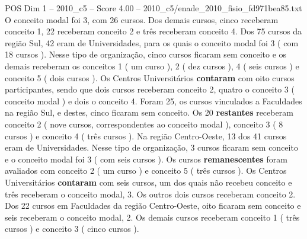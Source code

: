\begin{textsample}{POS Dim 1 – 2010\_c5 – Score 4.00 – 2010\_c5/enade\_2010\_fisio\_fd971bea85.txt}
O conceito modal foi 3, com 26 cursos.
Dos demais cursos, cinco receberam conceito 1, 22 receberam conceito 2 e três receberam conceito 4.
Dos 75 cursos da região Sul, 42 eram de Universidades, para os quais o conceito modal foi 3 ( com 18 cursos ).
Nesse tipo de organização, cinco cursos ficaram sem conceito e os demais receberam os conceitos 1 ( um curso ), 2 ( dez cursos ), 4 ( seis cursos ) e conceito 5 ( dois cursos ).
Os Centros Universitários \textbf{contaram} com oito cursos participantes, sendo que dois cursos receberam conceito 2, quatro o conceito 3 ( conceito modal ) e dois o conceito 4.
Foram 25, os cursos vinculados a Faculdades na região Sul, e destes, cinco ficaram sem conceito.
Os 20 \textbf{restantes} receberam conceito 2 ( nove cursos, correspondentes ao conceito modal ), conceito 3 ( 8 cursos ) e conceito 4 ( três cursos ).
Na região Centro-Oeste, 13 dos 41 cursos eram de Universidades.
Nesse tipo de organização, 3 cursos ficaram sem conceito e o conceito modal foi 3 ( com seis cursos ).
Os cursos \textbf{remanescentes} foram avaliados com conceito 2 ( um curso ) e conceito 5 ( três cursos ).
Os Centros Universitários \textbf{contaram} com seis cursos, um dos quais não recebeu conceito e três receberam o conceito modal, 3.
Os outros dois cursos receberam conceito 2.
Dos 22 cursos em Faculdades da região Centro-Oeste, oito ficaram sem conceito e seis receberam o conceito modal, 2.
Os demais cursos receberam conceito 1 ( três cursos ) e conceito 3 ( cinco cursos ).

\end{textsample}
